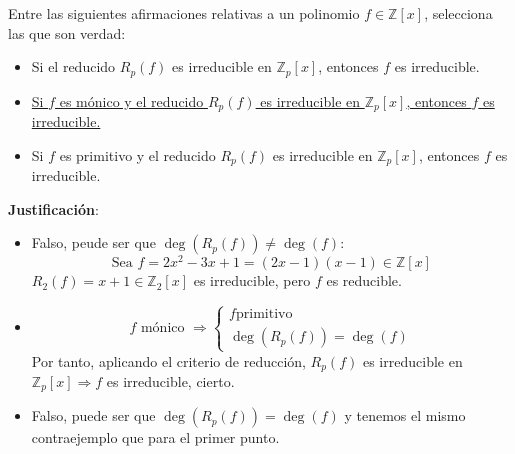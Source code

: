 \begin{ejercicio}
    Entre las siguientes afirmaciones relativas a un polinomio $f\in \mathbb{Z}[x]$, selecciona las que son verdad:
    \begin{itemize}
        \item Si el reducido $R_p(f)$ es irreducible en $\mathbb{Z}_p[x]$, entonces $f$ es irreducible.
        \item \underline{Si $f$ es mónico y el reducido $R_p(f)$ es irreducible en $\mathbb{Z}_p[x]$, entonces $f$ es irreducible.}
        \item Si $f$ es primitivo y el reducido $R_p(f)$ es irreducible en $\mathbb{Z}_p[x]$, entonces $f$ es irreducible.
    \end{itemize}

    \noindent
    \textbf{Justificación}:
    \begin{itemize}
        \item Falso, peude ser que $\deg(R_p(f))\neq \deg(f)$:
            \begin{equation*}
                \text{Sea\ } f=2x^2-3x+1=(2x-1)(x-1)\in \mathbb{Z}[x]
            \end{equation*}
            $R_2(f) = x+1\in \mathbb{Z}_2[x]$ es irreducible, pero $f$ es reducible.
        \item 
            \begin{equation*}
                f \text{\ mónico\ } \Longrightarrow \left\{\begin{array}{l}
                    f \text{primitivo} \\
                    \deg(R_p(f)) = \deg(f)
                \end{array}\right.
            \end{equation*}
            Por tanto, aplicando el criterio de reducción, $R_p(f)$ es irreducible en $\mathbb{Z}_p[x] \Longrightarrow f$ es irreducible, cierto.
        \item Falso, puede ser que $\deg(R_p(f)) = \deg(f)$ y tenemos el mismo contraejemplo que para el primer punto.
    \end{itemize}
\end{ejercicio}


